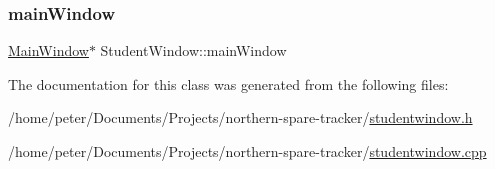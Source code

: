 \subsubsection{\texorpdfstring{main\+Window}{mainWindow}}
{\footnotesize\ttfamily \hyperlink{class_main_window}{Main\+Window}$\ast$ Student\+Window\+::main\+Window}



The documentation for this class was generated from the following files\+:\begin{DoxyCompactItemize}
\item 
/home/peter/\+Documents/\+Projects/northern-\/spare-\/tracker/\hyperlink{studentwindow_8h}{studentwindow.\+h}\item 
/home/peter/\+Documents/\+Projects/northern-\/spare-\/tracker/\hyperlink{studentwindow_8cpp}{studentwindow.\+cpp}\end{DoxyCompactItemize}
